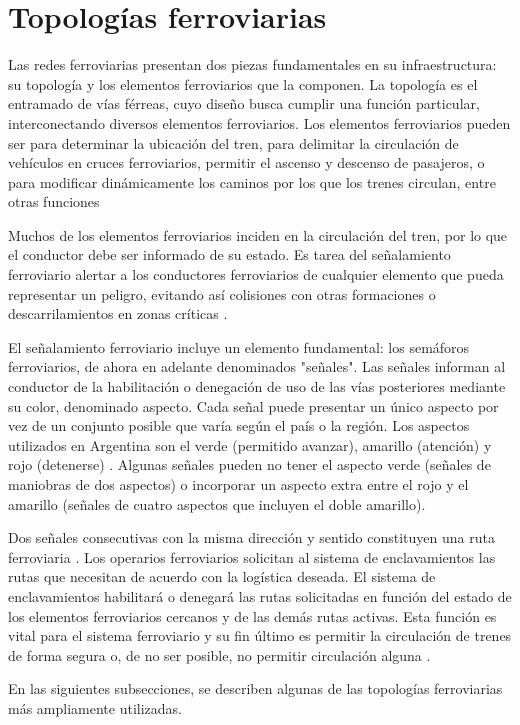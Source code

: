 \section{Topologías ferroviarias}
    \label{sec:topologias}
    Las redes ferroviarias presentan dos piezas fundamentales en su infraestructura: su topología y los elementos ferroviarios que la componen. La topología es el entramado de vías férreas, cuyo diseño busca cumplir una función particular, interconectando diversos elementos ferroviarios. Los elementos ferroviarios pueden ser para determinar la ubicación del tren, para delimitar la circulación de vehículos en cruces ferroviarios, permitir el ascenso y descenso de pasajeros, o para modificar dinámicamente los caminos por los que los trenes circulan, entre otras funciones \cite{Paper_4,Paper_13,Paper_17,Paper_175}

    Muchos de los elementos ferroviarios inciden en la circulación del tren, por lo que el conductor debe ser informado de su estado. Es tarea del señalamiento ferroviario alertar a los conductores ferroviarios de cualquier elemento que pueda representar un peligro, evitando así colisiones con otras formaciones o descarrilamientos en zonas críticas \cite{Paper_168,Paper_176,Paper_202,Paper_203}. 
    
    El señalamiento ferroviario incluye un elemento fundamental: los semáforos ferroviarios, de ahora en adelante denominados "señales". Las señales informan al conductor de la habilitación o denegación de uso de las vías posteriores mediante su color, denominado aspecto. Cada señal puede presentar un único aspecto por vez de un conjunto posible que varía según el país o la región. Los aspectos utilizados en Argentina son el verde (permitido avanzar), amarillo (atención) y rojo (detenerse) \cite{RITO}. Algunas señales pueden no tener el aspecto verde (señales de maniobras de dos aspectos) o incorporar un aspecto extra entre el rojo y el amarillo (señales de cuatro aspectos que incluyen el doble amarillo).
    
    Dos señales consecutivas con la misma dirección y sentido constituyen una ruta ferroviaria \cite{RITO,INTERLOCKING_BASIC,IRSE}. Los operarios ferroviarios solicitan al sistema de enclavamientos las rutas que necesitan de acuerdo con la logística deseada. El sistema de enclavamientos habilitará o denegará las rutas solicitadas en función del estado de los elementos ferroviarios cercanos y de las demás rutas activas. Esta función es vital para el sistema ferroviario y su fin último es permitir la circulación de trenes de forma segura o, de no ser posible, no permitir circulación alguna \cite{Paper_175,Paper_176,INTERLOCKING_BASIC,IRSE}.

	En las siguientes subsecciones, se describen algunas de las topologías ferroviarias más ampliamente utilizadas.
	
    
    
    
    